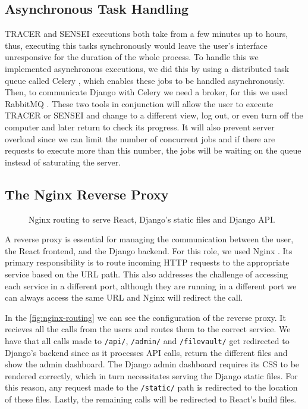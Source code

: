 \subsection{Asynchronous Task Handling}

\ac{TRACER} and SENSEI executions both take from a few minutes up to hours,
thus, executing this tasks synchronously would leave the user's interface unresponsive
for the duration of the whole process.
To handle this we implemented asynchronous executions,
we did this by using a distributed task queue called Celery \autocite{Celery},
which enables these jobs to be handled asynchronously.
Then, to communicate Django with Celery we need a broker,
for this we used RabbitMQ \autocite{RabbitMQ}.
These two tools in conjunction will allow the user to execute \ac{TRACER} or SENSEI
and change to a different view, log out, or even turn off the computer
and later return to check its progress.
It will also prevent server overload
since we can limit the number of concurrent jobs
and if there are requests to execute more than this number,
the jobs will be waiting on the queue instead of saturating the server.


\subsection{The Nginx Reverse Proxy}

\begin{figure}[htbp]
    \centering
    
    \caption{Nginx routing to serve React, Django's static files and Django API.}
    \label{fig:nginx-routing}
\end{figure}

A reverse proxy is essential for managing the communication between
the user, the React frontend, and the Django backend.
For this role, we used Nginx \autocite{Nginx}.
Its primary responsibility is to route incoming HTTP requests to the appropriate service based on the URL path.
This also addresses the challenge of accessing each service in a different port,
although they are running in a different port
we can always access the same URL and Nginx will redirect the call.

In the \autoref{fig:nginx-routing}
we can see the configuration of the reverse proxy.
It recieves all the calls from the users and routes them to the correct service.
We have that all calls made to \texttt{/api/}, \texttt{/admin/} and \texttt{/filevault/}
get redirected to Django's backend since as it processes \ac{API} calls,
return the different files and show the admin dashboard.
The Django admin dashboard requires its CSS to be rendered correctly,
which in turn necessitates serving the Django static files.
For this reason, any request made to the \texttt{/static/} path
is redirected to the location of these files.
Lastly, the remaining calls will be redirected to React's build files.


